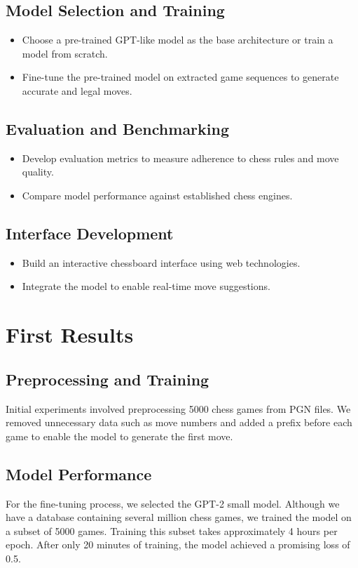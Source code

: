 \documentclass[11pt]{article}
\begin{document}
\subsection{Model Selection and Training}
\begin{itemize}
    \item Choose a pre-trained GPT-like model as the base architecture or train a model from scratch.
    \item Fine-tune the pre-trained model on extracted game sequences to generate accurate and legal moves.
\end{itemize}

\subsection{Evaluation and Benchmarking}
\begin{itemize}
    \item Develop evaluation metrics to measure adherence to chess rules and move quality.
    \item Compare model performance against established chess engines.
\end{itemize}

\subsection{Interface Development}
\begin{itemize}
    \item Build an interactive chessboard interface using web technologies.
    \item Integrate the model to enable real-time move suggestions.
\end{itemize}

\section{First Results}
\subsection{Preprocessing and Training}
Initial experiments involved preprocessing 5000 chess games from PGN files. We removed unnecessary data such as move numbers and added a prefix before each game to enable the model to generate the first move.

\subsection{Model Performance}
For the fine-tuning process, we selected the GPT-2 small model. Although we have a database containing several million chess games, we trained the model on a subset of 5000 games. Training this subset takes approximately 4 hours per epoch. After only 20 minutes of training, the model achieved a promising loss of 0.5.
\end{document}
